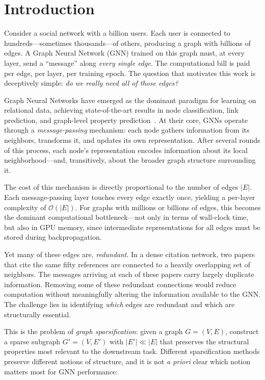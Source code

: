 \documentclass[conference]{IEEEtran}
\begin{document}
\section{Introduction}

Consider a social network with a billion users. Each user is connected to hundreds---sometimes thousands---of others, producing a graph with billions of edges. A Graph Neural Network (GNN) trained on this graph must, at every layer, send a ``message'' along \emph{every single edge}. The computational bill is paid per edge, per layer, per training epoch. The question that motivates this work is deceptively simple: \emph{do we really need all of those edges?}

Graph Neural Networks have emerged as the dominant paradigm for learning on relational data, achieving state-of-the-art results in node classification, link prediction, and graph-level property prediction~\cite{kipf2017, hamilton2017, velickovic2018}. At their core, GNNs operate through a \emph{message-passing} mechanism: each node gathers information from its neighbors, transforms it, and updates its own representation. After several rounds of this process, each node's representation encodes information about its local neighborhood---and, transitively, about the broader graph structure surrounding it.

The cost of this mechanism is directly proportional to the number of edges $|E|$. Each message-passing layer touches every edge exactly once, yielding a per-layer complexity of $\mathcal{O}(|E|)$. For graphs with millions or billions of edges, this becomes the dominant computational bottleneck---not only in terms of wall-clock time, but also in GPU memory, since intermediate representations for all edges must be stored during backpropagation.

Yet many of these edges are, \emph{redundant}. In a dense citation network, two papers that cite the same fifty references are connected to a heavily overlapping set of neighbors. The messages arriving at each of these papers carry largely duplicate information. Removing some of these redundant connections would reduce computation without meaningfully altering the information available to the GNN. The challenge lies in identifying \emph{which} edges are redundant and which are structurally essential.

This is the problem of \emph{graph sparsification}: given a graph $G = (V, E)$, construct a sparse subgraph $G' = (V, E')$ with $|E'| \ll |E|$ that preserves the structural properties most relevant to the downstream task. Different sparsification methods preserve different notions of structure, and it is not \emph{a priori} clear which notion matters most for GNN performance:
\end{document}
